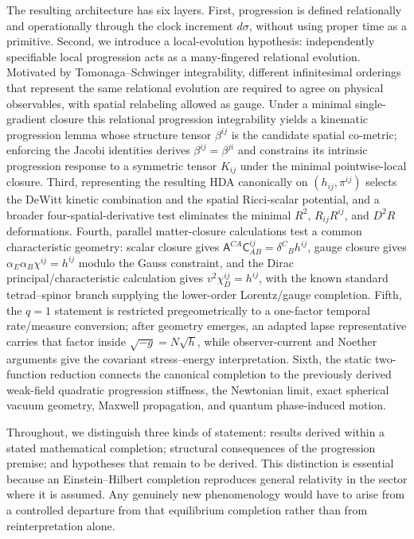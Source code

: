 \documentclass[11pt]{article}
\begin{document}
The resulting architecture has six layers. First, progression is defined relationally and operationally through the clock increment $d\sigma$, without using proper time as a primitive. Second, we introduce a local-evolution hypothesis: independently specifiable local progression acts as a many-fingered relational evolution. Motivated by Tomonaga--Schwinger integrability, different infinitesimal orderings that represent the same relational evolution are required to agree on physical observables, with spatial relabeling allowed as gauge. Under a minimal single-gradient closure this relational progression integrability yields a kinematic progression lemma whose structure tensor $\beta^{ij}$ is the candidate spatial co-metric; enforcing the Jacobi identities derives $\beta^{ij}=\beta^{ji}$ and constrains its intrinsic progression response to a symmetric tensor $K_{ij}$ under the minimal pointwise-local closure. Third, representing the resulting HDA canonically on $(h_{ij},\pi^{ij})$ selects the DeWitt kinetic combination and the spatial Ricci-scalar potential, and a broader four-spatial-derivative test eliminates the minimal $R^2$, $R_{ij}R^{ij}$, and $D^2R$ deformations. Fourth, parallel matter-closure calculations test a common characteristic geometry: scalar closure gives $\mathsf A^{CA}\mathsf C^{ij}_{AB}=\delta^C{}_B h^{ij}$, gauge closure gives $\alpha_E\alpha_B\chi^{ij}=h^{ij}$ modulo the Gauss constraint, and the Dirac principal/characteristic calculation gives $v^2\chi_D^{ij}=h^{ij}$, with the known standard tetrad--spinor branch supplying the lower-order Lorentz/gauge completion. Fifth, the $q=1$ statement is restricted pregeometrically to a one-factor temporal rate/measure conversion; after geometry emerges, an adapted lapse representative carries that factor inside $\sqrt{-g}=N\sqrt h$, while observer-current and Noether arguments give the covariant stress--energy interpretation. Sixth, the static two-function reduction connects the canonical completion to the previously derived weak-field quadratic progression stiffness, the Newtonian limit, exact spherical vacuum geometry, Maxwell propagation, and quantum phase-induced motion.

Throughout, we distinguish three kinds of statement: results derived within a stated mathematical completion; structural consequences of the progression premise; and hypotheses that remain to be derived. This distinction is essential because an Einstein--Hilbert completion reproduces general relativity in the sector where it is assumed. Any genuinely new phenomenology would have to arise from a controlled departure from that equilibrium completion rather than from reinterpretation alone.
\end{document}
